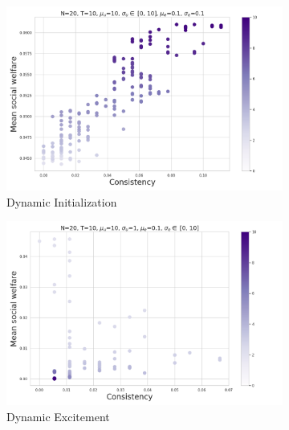 \begin{figure}
    \centering
        \begin{subfigure}[b]{0.49\textwidth}
         \centering
         \includegraphics[width=\textwidth]{figures/mpda_dynamics_initliazation.png}
         \caption{Dynamic Initialization}
         \label{fig:init}
        \end{subfigure}
         \begin{subfigure}[b]{0.49\textwidth}
         \centering
         \includegraphics[width=\textwidth]{figures/mpda_dynamics_excitement_std.png}
         \caption{Dynamic Excitement}
         \label{fig:excite_std}
     \end{subfigure}
         \begin{subfigure}[b]{0.49\textwidth}
         \centering

\end{subfigure}
\end{figure}
